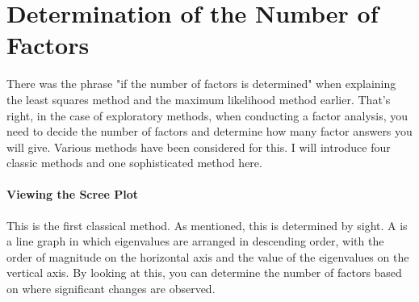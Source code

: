 \documentclass{ltjsbook}
\begin{document}
\section{Determination of the Number of Factors}
There was the phrase "if the number of factors is determined" when explaining the least squares method and the maximum likelihood method earlier. That's right, in the case of exploratory methods, when conducting a factor analysis, you need to decide the number of factors and determine how many factor answers you will give. Various methods have been considered for this.
I will introduce four classic methods and one sophisticated method here.
\paragraph{Viewing the Scree Plot} This is the first classical method. As mentioned, this is determined by sight. A  is a line graph in which eigenvalues are arranged in descending order, with the order of magnitude on the horizontal axis and the value of the eigenvalues on the vertical axis. By looking at this, you can determine the number of factors based on where significant changes are observed.
\end{document}
